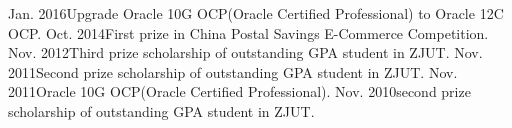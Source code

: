 \documentclass[9pt,a4paper]{article}
\begin{document}
\spacedhrule{-0.2em}{-0.4em}
\inlineheadsection  %
{Jan. 2016}{Upgrade Oracle 10G OCP(Oracle Certified Professional) to Oracle 12C OCP.}
\inlineheadsection
{Oct. 2014}{First prize in China Postal Savings E-Commerce Competition.} 
\inlineheadsection
{Nov. 2012}{Third prize scholarship of outstanding GPA student in ZJUT.} 
\inlineheadsection
{Nov. 2011}{Second prize scholarship of outstanding GPA student in ZJUT.} 
\inlineheadsection
{Nov. 2011}{Oracle 10G OCP(Oracle Certified Professional).} 
\inlineheadsection
{Nov. 2010}{second prize scholarship of outstanding GPA student in ZJUT.} 
\end{document}
